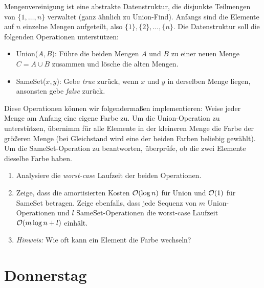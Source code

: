 \documentclass{uebung_cs}
\begin{document}
\begin{exercise}[Mengenvereinigung]
	Mengenvereinigung ist eine abstrakte Datenstruktur, die disjunkte Teilmengen von $\{1,\dots,n\}$ verwaltet (ganz ähnlich zu Union-Find).
	Anfangs sind die Elemente auf $n$ einzelne Mengen aufgeteilt, also $\{1\}, \{2\}, \dots,\{n\}$.
	Die Datenstruktur soll die folgenden Operationen unterstützen:
	\begin{itemize}
		\item Union($A,B$): Führe die beiden Mengen $A$ und $B$ zu einer neuen Menge $C = A \cup B$ zusammen und lösche die alten Mengen.
		\item SameSet($x,y$): Gebe \textit{true} zurück, wenn $x$ und $y$ in derselben Menge liegen, ansonsten gebe \textit{false} zurück.
	\end{itemize}
	Diese Operationen können wir folgendermaßen implementieren: Weise jeder Menge am Anfang eine eigene Farbe zu. Um die Union-Operation zu unterstützen, übernimm für alle Elemente in der kleineren Menge die Farbe der größeren Menge (bei Gleichstand wird eine der beiden Farben beliebig gewählt). Um die SameSet-Operation zu beantworten, überprüfe, ob die zwei Elemente dieselbe Farbe haben.
	
	\begin{enumerate}
		\item Analysiere die \textit{worst-case} Laufzeit der beiden Operationen.
		\item Zeige, dass die amortisierten Kosten $\mathcal{O}(\log n)$ für Union und $\mathcal{O}(1)$ für SameSet betragen. Zeige ebenfalls, dass jede Sequenz von $m$ Union-Operationen und $l$ SameSet-Operationen die worst-case Laufzeit $\mathcal{O}(m \log n + l)$ einhält.
		\item[] \textit{Hinweis:} Wie oft kann ein Element die Farbe wechseln?
	\end{enumerate}
\end{exercise}

\section*{Donnerstag}
\end{document}

